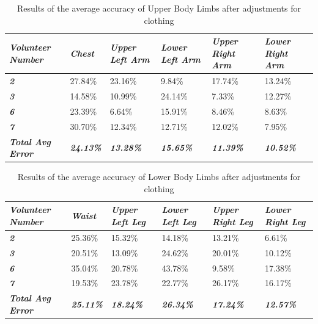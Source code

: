 \begin{table}[htbp]
	\centering
	\caption{Results of the average accuracy of Upper Body Limbs after adjustments for clothing}
	\begin{tabularx}{\textwidth}{|Y|Y|Y|Y|Y|Y|}
		\toprule
		\textit{\textbf{Volunteer Number}} & \textit{\textbf{Chest}} & \textit{\textbf{Upper Left Arm}} & \textit{\textbf{Lower Left Arm}} & \textit{\textbf{Upper Right Arm}} & \textit{\textbf{Lower Right Arm}} \\
		\midrule
		\textit{\textbf{2}} & 27.84\% & 23.16\% & 9.84\% & 17.74\% & 13.24\% \\
		\midrule
		\textit{\textbf{3}} & 14.58\% & 10.99\% & 24.14\% & 7.33\% & 12.27\% \\
		\midrule
		\textit{\textbf{6}} & 23.39\% & 6.64\% & 15.91\% & 8.46\% & 8.63\% \\
		\midrule
		\textit{\textbf{7}} & 30.70\% & 12.34\% & 12.71\% & 12.02\% & 7.95\% \\
		\midrule
		\textit{\textbf{Total Avg Error}} & \textit{\textbf{24.13\%}} & \textit{\textbf{13.28\%}} & \textit{\textbf{15.65\%}} & \textit{\textbf{11.39\%}} & \textit{\textbf{10.52\%}} \\
		\bottomrule
	\end{tabularx}%
	\label{tab:upperBodyResultsClothingAdj}%
\end{table}%

\begin{table}[htbp]
	\centering
	\caption{Results of the average accuracy of Lower Body Limbs after adjustments for clothing}
	\begin{tabularx}{\textwidth}{|Y|Y|Y|Y|Y|Y|}
		\toprule
		\textit{\textbf{Volunteer Number}} & \textit{\textbf{Waist}} & \textit{\textbf{Upper Left Leg}} & \textit{\textbf{Lower Left Leg}} & \textit{\textbf{Upper Right Leg}} & \textit{\textbf{Lower Right Leg}} \\
		\midrule
		\textit{\textbf{2}} & 25.36\% & 15.32\% & 14.18\% & 13.21\% & 6.61\% \\
		\midrule
		\textit{\textbf{3}} & 20.51\% & 13.09\% & 24.62\% & 20.01\% & 10.12\% \\
		\midrule
		\textit{\textbf{6}} & 35.04\% & 20.78\% & 43.78\% & 9.58\% & 17.38\% \\
		\midrule
		\textit{\textbf{7}} & 19.53\% & 23.78\% & 22.77\% & 26.17\% & 16.17\% \\
		\midrule
		\textit{\textbf{Total Avg Error}} & \textit{\textbf{25.11\%}} & \textit{\textbf{18.24\%}} & \textit{\textbf{26.34\%}} & \textit{\textbf{17.24\%}} & \textit{\textbf{12.57\%}} \\
		\bottomrule
	\end{tabularx}%
	\label{tab:lowerBodyResultsClothingAdj}%
\end{table}%


